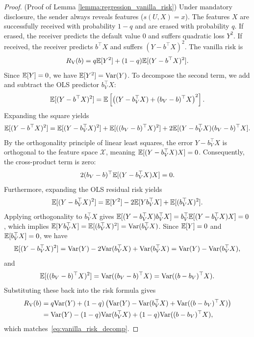 \begin{proof}(Proof of Lemma \ref{lemma:regression_vanilla_risk})\label{proof:vanilla_risk}\label{app:proof_vanilla_risk}
Under mandatory disclosure, the sender always reveals features ($s(U,X) = x$). The features $X$ are successfully received with probability $1 - q$ and are erased with probability $q$. If erased, the receiver predicts the default value $0$ and suffers quadratic loss $Y^2$. If received, the receiver predicts $b^\top X$ and suffers $(Y - b^\top X)^2$. The vanilla risk is
\begin{equation*}
    R_{\mathrm{V}}(b) = q\mathbb{E}[Y^2] + (1 - q)\mathbb{E}[(Y - b^\top X)^2].
\end{equation*}
Since $\mathbb{E}[Y] = 0$, we have $\mathbb{E}[Y^2] = \mathrm{Var}(Y)$.
To decompose the second term, we add and subtract the OLS predictor $b_V^\top X$:
\begin{equation*}
    \mathbb{E}[(Y - b^\top X)^2] = \mathbb{E}\left[ \left( (Y - b_V^\top X) + (b_V - b)^\top X \right)^2 \right].
\end{equation*}
Expanding the square yields
\begin{equation*}
    \mathbb{E}[(Y - b^\top X)^2] = \mathbb{E}[(Y - b_V^\top X)^2] + \mathbb{E}[((b_V - b)^\top X)^2] + 2\mathbb{E}[(Y - b_V^\top X)(b_V - b)^\top X].
\end{equation*}
By the orthogonality principle of linear least squares, the error $Y - b_V^\top X$ is orthogonal to the feature space $\mathcal{X}$, meaning $\mathbb{E}[(Y - b_V^\top X)X] = 0$. Consequently, the cross-product term is zero:
\begin{equation*}
    2(b_V - b)^\top \mathbb{E}[(Y - b_V^\top X)X] = 0.
\end{equation*}
Furthermore, expanding the OLS residual risk yields
\begin{equation*}
    \mathbb{E}[(Y - b_V^\top X)^2] = \mathbb{E}[Y^2] - 2\mathbb{E}[Y b_V^\top X] + \mathbb{E}[(b_V^\top X)^2].
\end{equation*}
Applying orthogonality to $b_V^\top X$ gives $\mathbb{E}[(Y - b_V^\top X) b_V^\top X] = b_V^\top \mathbb{E}[(Y - b_V^\top X) X] = 0$, which implies $\mathbb{E}[Y b_V^\top X] = \mathbb{E}[(b_V^\top X)^2] = \mathrm{Var}(b_V^\top X)$. Since $\mathbb{E}[Y] = 0$ and $\mathbb{E}[b_V^\top X] = 0$, we have
\begin{equation*}
    \mathbb{E}[(Y - b_V^\top X)^2] = \mathrm{Var}(Y) - 2\mathrm{Var}(b_V^\top X) + \mathrm{Var}(b_V^\top X) = \mathrm{Var}(Y) - \mathrm{Var}(b_V^\top X),
\end{equation*}
and
\begin{equation*}
    \mathbb{E}[((b_V - b)^\top X)^2] = \mathrm{Var}((b_V - b)^\top X) = \mathrm{Var}((b - b_V)^\top X).
\end{equation*}
Substituting these back into the risk formula gives
\begin{align*}
    R_{\mathrm{V}}(b) &= q\mathrm{Var}(Y) + (1 - q)\left( \mathrm{Var}(Y) - \mathrm{Var}(b_V^\top X) + \mathrm{Var}((b - b_V)^\top X) \right) \nonumber \\
    &= \mathrm{Var}(Y) - (1 - q)\mathrm{Var}(b_V^\top X) + (1 - q)\mathrm{Var}((b - b_V)^\top X),
\end{align*}
which matches~\eqref{eq:vanilla_risk_decomp}. 


\end{proof}
